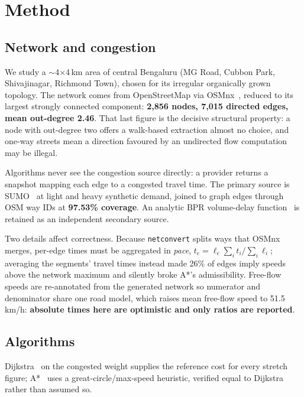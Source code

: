 \section{Method}
\label{sec:method}

\subsection{Network and congestion}

We study a $\sim$4$\times$4\,km area of central Bengaluru (MG Road, Cubbon
Park, Shivajinagar, Richmond Town), chosen for its irregular organically
grown topology. The network comes from OpenStreetMap via
OSMnx~\cite{boeing2017osmnx}, reduced to its largest strongly connected
component: \textbf{2{,}856 nodes, 7{,}015 directed edges, mean out-degree
2.46}. That last figure is the decisive structural property: a node with out-degree
two offers a walk-based extraction almost no choice, and one-way
streets mean a direction favoured by an undirected flow computation may be
illegal.

Algorithms never see the congestion source directly: a provider returns a
snapshot mapping each edge to a congested travel time. The primary source is
SUMO~\cite{lopez2018microscopic} at light and heavy synthetic demand, joined
to graph edges through OSM way IDs at \textbf{97.53\% coverage}. An analytic
BPR volume-delay function~\cite{bpr1964} is retained as an independent
secondary source.

Two details affect correctness. Because \texttt{netconvert} splits ways that
OSMnx merges, per-edge times must be aggregated in \emph{pace},
$t_e = \ell_e \sum_i t_i / \sum_i \ell_i$; averaging the segments' travel
times instead made 26\% of edges imply speeds above the network maximum and
silently broke A*'s admissibility. Free-flow speeds are re-annotated from the
generated network so numerator and denominator share one road model, which
raises mean free-flow speed to 51.5\,km/h: \textbf{absolute times here are
optimistic and only ratios are reported}.

\subsection{Algorithms}

Dijkstra~\cite{dijkstra1959note} on the congested weight supplies the
reference cost for every stretch figure; A*~\cite{hart1968formal} uses a
great-circle/max-speed heuristic, verified equal to Dijkstra rather than
assumed so.

